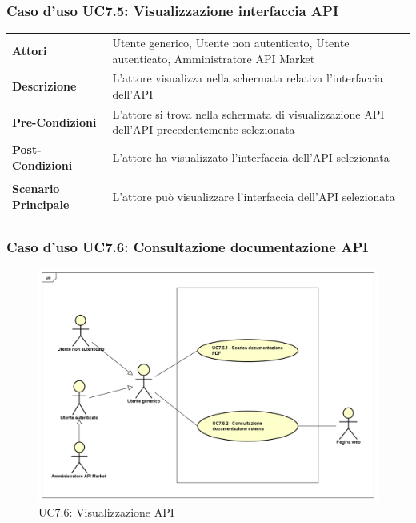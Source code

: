 \subsubsection{Caso d'uso UC7.5: Visualizzazione interfaccia API}
\label{UC7_5}

\begin{minipage}{\linewidth}
	\begin{tabular}{ l | p{11cm}}
		\hline
		\rowcolor{Gray}
		\multicolumn{2}{c}{UC7.5 - Visualizzazione interfaccia API} \\
		\hline
		\textbf{Attori} & Utente generico, Utente non autenticato, Utente autenticato, Amministratore API Market \\
		\textbf{Descrizione} & L'attore visualizza nella schermata relativa l'interfaccia dell'API \\
		\textbf{Pre-Condizioni} & L'attore si trova nella schermata di visualizzazione API dell'API precedentemente selezionata \\
		\textbf{Post-Condizioni} & L'attore ha visualizzato l'interfaccia dell'API selezionata \\
		\textbf{Scenario Principale} & 
		\begin{enumerate*}[label=(\arabic*.),itemjoin={\newline}]
			\item L'attore può visualizzare l'interfaccia dell'API selezionata
		\end{enumerate*}\\
	\end{tabular}
\end{minipage}

\newpage
\subsubsection{Caso d'uso UC7.6: Consultazione documentazione API}
\label{UC7_6}
\begin{figure}[ht]
	\centering
	\includegraphics[scale=0.45]{UML/UC7_6.png}
	\caption{UC7.6: Visualizzazione API}
\end{figure}

